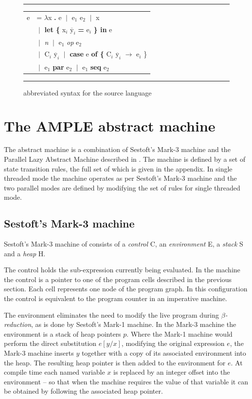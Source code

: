 \documentclass{llncs}
\begin{document}
\begin{figure}
\hrule
\medskip
\begin{tabular}{p{1cm}l}
e  & = \textbf{$\lambda$}x \textbf{.} e 
     $\;|\;$  e$_1$ e$_2$  
     $\;|\;$  x \\
   & $\;|\;$  \textbf{let \{} x$_i$ $\overline{\textrm{y}}_i$ \textbf{=} e$_i$ \textbf{\} in} e \\
   & $\;|\;$  \emph{n} $\;|\;$ e$_1$ \emph{op} e$_2$ \\
   & $\;|\;$  C$_{i}$ $\overline{\textrm{y}}_i$ 
     $\;|\;$  \textbf{case} e \textbf{of \{} C$_i$ $\overline{\textrm{y}}_i$ \textbf{$\rightarrow$} e$_i$ \} \\
   & $\;|\;$  e$_1$ \textbf{par} e$_2$ 
    $\;|\;$  e$_1$ \textbf{seq} e$_2$ \\
\end{tabular}
\medskip
\hrule
\caption{abbreviated syntax for the \ample source language}
\label{figSourceSyntax}
\end{figure}


\section{The AMPLE abstract machine}
The \ample abstract machine is a combination of Sestoft's \mbox{Mark-3} machine \cite{sestoft:abstractmachine} and the Parallel Lazy Abstract Machine described in \cite{baker-finch:sfp99}. The machine is defined by a set of state transition rules, the full set of which is given in the appendix. In single threaded mode the machine operates as per Sestoft's \mbox{Mark-3} machine and the two parallel modes are defined by modifying the set of rules for single threaded mode.


\subsection{Sestoft's Mark-3 machine}
Sestoft's \mbox{Mark-3} machine of consists of a \emph{control} C, an \emph{environment} E, a \emph{stack} S and a \emph{heap} H. 

The control holds the sub-expression currently being evaluated. In the \ample machine the control is a pointer to one of the program cells described in the previous section. Each cell represents one node of the program graph. In this configuration the control is equivalent to the program counter in an imperative machine.

The environment eliminates the need to modify the live program during \mbox{$\beta$\emph{-reduction}}, as is done by Sestoft's \mbox{Mark-1} machine. In the \mbox{Mark-3} machine the environment is a stack of heap pointers $p$. Where the \mbox{Mark-1} machine would perform the direct substitution $e[y/x]$, modifying the original expression $e$, the \mbox{Mark-3} machine inserts $y$ together with a copy of its associated environment into the heap. The resulting heap pointer is then added to the environment for $e$. At compile time each named variable $x$ is replaced by an integer offset into the environment -- so that when the machine requires the value of that variable it can be obtained by following the associated heap pointer.
\end{document}
